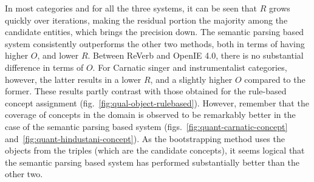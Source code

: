 \documentclass{llncs}
\begin{document}

In most categories and for all the three systems, it can be seen that $R$ grows quickly over iterations, making the residual portion the majority among the candidate entities, which brings the precision down. The semantic parsing based system consistently outperforms the other two methods, both in terms of having higher $O$, and lower $R$. Between ReVerb and OpenIE 4.0, there is no substantial difference in terms of $O$. For Carnatic singer and instrumentalist categories, however, the latter results in a lower $R$, and a slightly higher $O$ compared to the former. These results partly contrast with those obtained for the rule-based concept assignment (fig.~\ref{fig:qual-object-rulebased}). However, remember that the coverage of concepts in the domain is observed to be remarkably better in the case of the semantic parsing based system 
(figs.~\ref{fig:quant-carnatic-concept} and~\ref{fig:quant-hindustani-concept}). As the bootstrapping method uses the objects from the triples (which are the candidate concepts), it seems logical that the semantic parsing based system has performed substantially better than the other two.
\end{document}
